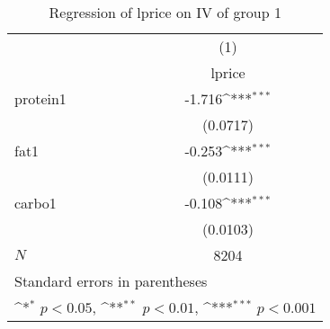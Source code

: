 \begin{table}[htbp]\centering
\def\sym#1{\ifmmode^{#1}\else\(^{#1}\)\fi}
\caption{Regression of lprice on IV of group 1 \label{tabcarb1}}
\begin{tabular}{l*{1}{c}}
\hline\hline
            &\multicolumn{1}{c}{(1)}\\
            &\multicolumn{1}{c}{lprice}\\
\hline
protein1    &      -1.716\sym{***}\\
            &    (0.0717)         \\
[1em]
fat1        &      -0.253\sym{***}\\
            &    (0.0111)         \\
[1em]
carbo1      &      -0.108\sym{***}\\
            &    (0.0103)         \\
\hline
\(N\)       &        8204         \\
\hline\hline
\multicolumn{2}{l}{\footnotesize Standard errors in parentheses}\\
\multicolumn{2}{l}{\footnotesize \sym{*} \(p<0.05\), \sym{**} \(p<0.01\), \sym{***} \(p<0.001\)}\\
\end{tabular}
\end{table}
